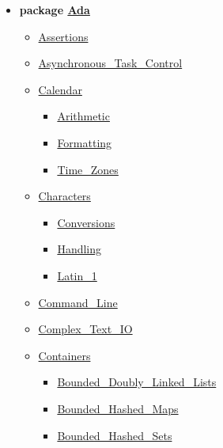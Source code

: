 \documentclass[english]{article}
\begin{document}
\begin{scriptsize}
\begin{multicols*}{5}
\begin{itemize}[leftmargin=0mm]
\item[] \textbf{package \href{http://www.ada-auth.org/standards/22rm/html/RM-A-2.html}{Ada}}
  \begin{itemize}[leftmargin=5mm]
  \item[] \href{http://www.ada-auth.org/standards/22rm/html/RM-11-4-2.html}{Assertions}
  \item[] \href{http://www.ada-auth.org/standards/22rm/html/RM-D-11.html}{Asynchronous\_Task\_Control}
  \item[] \href{http://www.ada-auth.org/standards/22rm/html/RM-9-6.html}{Calendar}
	\begin{itemize}[leftmargin=5mm]
	\item[] \href{http://www.ada-auth.org/standards/22rm/html/RM-9-6-1.html}{Arithmetic}
	\item[] \href{http://www.ada-auth.org/standards/22rm/html/RM-9-6-1.html}{Formatting}
	\item[] \href{http://www.ada-auth.org/standards/22rm/html/RM-9-6-1.html}{Time\_Zones}
	\end{itemize}
  \item[] \href{http://www.ada-auth.org/standards/22rm/html/RM-A-3-1.html}{Characters}
	\begin{itemize}[leftmargin=5mm]
	\item[] \href{http://www.ada-auth.org/standards/22rm/html/RM-A-3-4.html}{Conversions}
	\item[] \href{http://www.ada-auth.org/standards/22rm/html/RM-A-3-2.html}{Handling}
	\item[] \href{http://www.ada-auth.org/standards/22rm/html/RM-A-3-3.html}{Latin\_1}
	\end{itemize}
  \item[] \href{http://www.ada-auth.org/standards/22rm/html/RM-A-15.html}{Command\_Line}
  \item[] \href{http://www.ada-auth.org/standards/22rm/html/RM-G-1-3.html}{Complex\_Text\_IO}
  \item[] \href{http://www.ada-auth.org/standards/22rm/html/RM-A-18-1.html}{Containers}
	\begin{itemize}[leftmargin=5mm]
	\item[] \href{http://www.ada-auth.org/standards/22rm/html/RM-A-18-20.html}{Bounded\_Doubly\_Linked\_Lists}
	\item[] \href{http://www.ada-auth.org/standards/22rm/html/RM-A-18-21.html}{Bounded\_Hashed\_Maps}
	\item[] \href{http://www.ada-auth.org/standards/22rm/html/RM-A-18-23.html}{Bounded\_Hashed\_Sets}

\end{itemize}
\end{itemize}
\end{itemize}
\end{multicols*}
\end{scriptsize}
\end{document}
